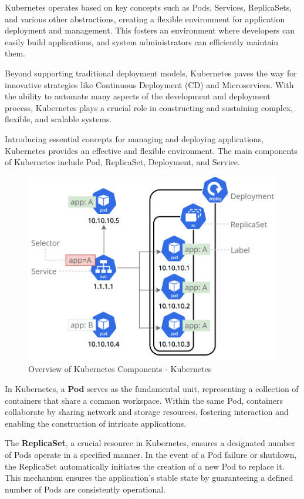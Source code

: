 Kubernetes operates based on key concepts such as Pods, Services, ReplicaSets, and various other abstractions, creating a flexible environment for application deployment and management. This fosters an environment where developers can easily build applications, and system administrators can efficiently maintain them.

Beyond supporting traditional deployment models, Kubernetes paves the way for innovative strategies like Continuous Deployment (CD) and Microservices. With the ability to automate many aspects of the development and deployment process, Kubernetes plays a crucial role in constructing and sustaining complex, flexible, and scalable systems.

Introducing essential concepts for managing and deploying applications, Kubernetes provides an effective and flexible environment. The main components of Kubernetes include Pod, ReplicaSet, Deployment, and Service.

\begin{figure}[H]
    \centering
    \includegraphics[width=0.75\linewidth]{Images/3.4-k8s-comps.png}
    \caption{Overview of Kubernetes Components - Kubernetes}
    \label{fig:k8s-comps}
\end{figure}

In Kubernetes, a \textbf{Pod} serves as the fundamental unit, representing a collection of containers that share a common workspace. Within the same Pod, containers collaborate by sharing network and storage resources, fostering interaction and enabling the construction of intricate applications.

The \textbf{ReplicaSet}, a crucial resource in Kubernetes, ensures a designated number of Pods operate in a specified manner. In the event of a Pod failure or shutdown, the ReplicaSet automatically initiates the creation of a new Pod to replace it. This mechanism ensures the application's stable state by guaranteeing a defined number of Pods are consistently operational.

